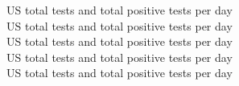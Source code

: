 \documentclass[12pt]{article}
\begin{document}
\clearpage

 US total tests and total positive tests per day\\
 US total tests and total positive tests per day\\
 US total tests and total positive tests per day\\
 US total tests and total positive tests per day\\
 US total tests and total positive tests per day


\end{document}
